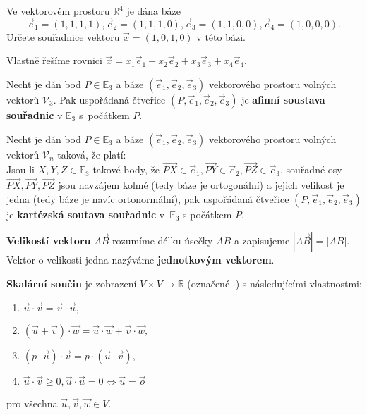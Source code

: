 \begin{priklad}
Ve vektorovém prostoru $\mathbb R^4$ je dána báze
\begin{equation*}
    \vec e_1=(1,1,1,1), \vec e_2 = (1,1,1,0), \vec e_3 = (1,1,0,0), \vec e_4 = (1,0,0,0).
\end{equation*}
Určete souřadnice vektoru $\vec x = (1,0,1,0)$ v této bázi.
\end{priklad}

\begin{reseni}
Vlastně řešíme rovnici $\vec x= x_1\vec e_1 + x_2\vec e_2 + x_3\vec e_3 + x_4\vec e_4.$
\end{reseni}

\begin{definition}
    Nechť je dán bod $P\in \mathbb E_3$ a báze $(\vec e_1, \vec e_2, \vec e_3)$ vektorového
    prostoru volných vektorů $\mathscr V_3$. Pak uspořádaná čtveřice
    $(P, \vec e_1, \vec e_2, \vec e_3)$ je
    \textbf{afinní soustava souřadnic} v $\mathbb E_3$ s~počátkem $P$.
\end{definition}

\begin{definition}
    Nechť je dán bod $P\in \mathbb E_3$ a báze $(\vec e_1, \vec e_2, \vec e_3)$ vektorového
    prostoru volných vektorů $\mathscr V_n$ taková, že platí:\\
    Jsou-li $X,Y,Z\in \mathbb E_3$ takové body, že
    $\overrightarrow{PX}\in\vec e_1,\overrightarrow{PY}\in\vec e_2,
    \overrightarrow{PZ}\in\vec e_3$, souřadné osy $\overrightarrow{PX},\overrightarrow{PY},
    \overrightarrow{PZ}$ jsou navzájem kolmé (tedy báze je ortogonální) a jejich velikost je jedna (tedy báze je navíc ortonormální),
    pak uspořádaná čtveřice $(P, \vec e_1, \vec e_2, \vec e_3)$ je \textbf{kartézská
    soutava souřadnic} v~$\mathbb E_3$ s počátkem $P$.
\end{definition}

\begin{definition}
\textbf{Velikostí vektoru} $\overrightarrow{AB}$ rozumíme délku úsečky $AB$ a zapisujeme
$|\overrightarrow{AB}| = |AB|.$ Vektor o velikosti jedna nazýváme \textbf{jednotkovým
vektorem}.
\end{definition}

\begin{definition}
\textbf{Skalární součin} je zobrazení $V\times V\to \mathbb R$ (označené $\cdot$) s následujícími vlastnostmi:
\begin{enumerate}[$i.$]
\item $\vec u \cdot \vec v = \vec v \cdot \vec u,$
\item $(\vec u+\vec v)\cdot \vec w = \vec u\cdot \vec w + \vec v\cdot \vec w,$
\item $(p\cdot \vec u)\cdot \vec v = p\cdot(\vec u \cdot \vec v),$
\item $\vec u\cdot \vec v \geq 0, \vec u \cdot \vec u = 0 \iff \vec u = \vec o$
\end{enumerate}
pro všechna $\vec u, \vec v, \vec w \in V.$
\end{definition}


